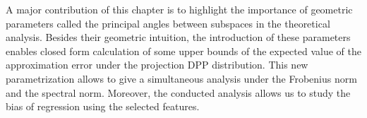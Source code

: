 \documentclass[twoside,11pt]{book}
\newtheorem{theorem}{Theorem}
\numberwithin{theorem}{chapter}
\numberwithin{definition}{chapter}
\numberwithin{proposition}{chapter}
\numberwithin{corollary}{chapter}
\numberwithin{example}{chapter}
\numberwithin{lemma}{chapter}
\numberwithin{assumption}{chapter}
\DeclareMathOperator{\Det}{Det}
\DeclareMathOperator{\Fr}{\mathrm{Fr}}
\DeclareMathOperator{\VS}{\mathrm{VS}}
\DeclareMathOperator{\Tran}{\intercal}
\DeclareMathOperator{\EX}{\mathbb{E}}
\DeclareMathOperator{\Prb}{\mathbb{P}}
\begin{document}
A major contribution of this chapter is to highlight the importance of geometric parameters called the principal angles between subspaces in the theoretical analysis. Besides their geometric intuition, the introduction of these parameters enables closed form calculation of some upper bounds of the expected value of the approximation error under the projection DPP distribution.
This new parametrization allows to give a simultaneous analysis under the Frobenius norm and the spectral norm. Moreover, the conducted analysis allows us to study the bias of regression using the selected features.







\end{document}
